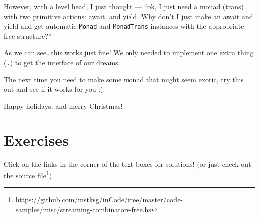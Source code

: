 \documentclass[]{article}
\renewcommand{\href}[2]{#2\footnote{\url{#1}}}
\begin{document}
However, with a level head, I just thought --- ``ok, I just need a monad (trans)
with two primitive actions: await, and yield. Why don't I just make an await and
yield and get automatic \texttt{Monad} and \texttt{MonadTrans} instances with
the appropriate free structure?''

As we can see\ldots this works just fine! We only needed to implement one extra
thing (\texttt{.\textbar{}}) to get the interface of our dreams.

The next time you need to make some monad that might seem exotic, try this out
and see if it works for you :)

Happy holidays, and merry Christmas!

\hypertarget{exercises}{%
\section{Exercises}\label{exercises}}

Click on the links in the corner of the text boxes for solutions! (or just check
out
\href{https://github.com/mstksg/inCode/tree/master/code-samples/misc/streaming-combinators-free.hs}{the
source file})
\end{document}
